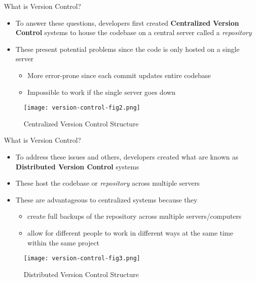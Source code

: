 \documentclass{beamer}
\begin{document}
\begin{frame}{What is Version Control?}

\begin{itemize}
    \item To answer these questions, developers first created \textbf{Centralized Version Control} systems to house the codebase on a central server called a \textit{repository}
    \item These present potential problems since the code is only hosted on a single server
    \begin{itemize}
        \item More error-prone since each commit updates entire codebase
        \item Impossible to work if the single server goes down
    \end{itemize}
\end{itemize}

\begin{figure}
\texttt{[image: version-control-fig2.png]}
\caption{\label{fig:your-figure}Centralized Version Control Structure}
\end{figure}
    
\end{frame}

\begin{frame}{What is Version Control?}

\begin{itemize}
    \item To address these issues and others, developers created what are known as \textbf{Distributed Version Control} systems
    \item These host the codebase or \textit{repository} across multiple servers
    \item These are advantageous to centralized systems because they
    \begin{itemize}
        \item create full backups of the repository across multiple servers/computers
        \item allow for different people to work in different ways at the same time within the same project
    \end{itemize}
\end{itemize}

\begin{figure}
\texttt{[image: version-control-fig3.png]}
\caption{\label{fig:your-figure}Distributed Version Control Structure}
\end{figure}
    
\end{frame}
\end{document}
